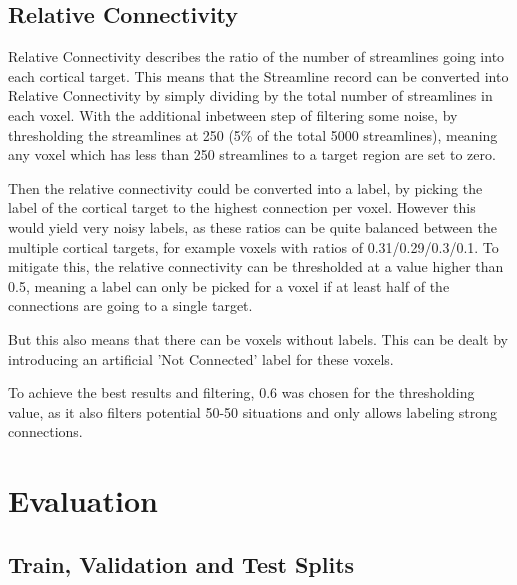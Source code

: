 \subsection{Relative Connectivity}
\label{sec:conpre}

Relative Connectivity describes the ratio of the number of streamlines going into each cortical target. This means that the Streamline record can be converted into Relative Connectivity by simply dividing by the total number of streamlines in each voxel. With the additional inbetween step of filtering some noise, by thresholding the streamlines at 250 (5\% of the total 5000 streamlines), meaning any voxel which has less than 250 streamlines to a target region are set to zero.\par
Then the relative connectivity could be converted into a label, by picking the label of the cortical target to the highest connection per voxel. However this would yield very noisy labels, as these ratios can be quite balanced between the multiple cortical targets, for example voxels with ratios of 0.31/0.29/0.3/0.1. To mitigate this, the relative connectivity can be thresholded at a value higher than 0.5, meaning a label can only be picked for a voxel if at least half of the connections are going to a single target.\par
But this also means that there can be voxels without labels. This can be dealt by introducing an artificial 'Not Connected' label for these voxels.\par
To achieve the best results and filtering, 0.6 was chosen for the thresholding value, as it also filters potential 50-50 situations and only allows labeling strong connections.

\section{Evaluation}

\subsection{Train, Validation and Test Splits}
\label{sec:travaltes}

